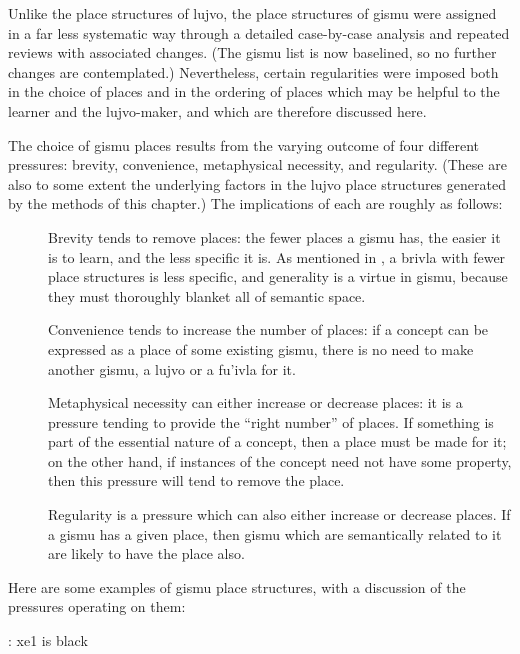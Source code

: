Unlike the place structures of lujvo, the place structures
    of gismu were assigned in a far less systematic way through a
    detailed case-by-case analysis and repeated reviews with
    associated changes. (The gismu list is now baselined, so no
    further changes are contemplated.) Nevertheless, certain
    regularities were imposed both in the choice of places and in
    the ordering of places which may be helpful to the learner and
    the lujvo-maker, and which are therefore discussed here.

The choice of gismu places results from the varying outcome
    of four different pressures: brevity, convenience, metaphysical
    necessity, and regularity. (These are also to some extent the
    underlying factors in the lujvo place structures generated by
    the methods of this chapter.) The implications of each are
    roughly as follows:
\begin{description}
\item[] Brevity tends to remove places: the fewer places a gismu has, the easier it is to learn, and the less specific it is. As mentioned in , a brivla with fewer place structures is less specific, and generality is a virtue in gismu, because they must thoroughly blanket all of semantic space.
\item[] Convenience tends to increase the number of places: if a concept can be expressed as a place of some existing gismu, there is no need to make another gismu, a lujvo or a fu'ivla for it.
\item[] Metaphysical necessity can either increase or decrease places: it is a pressure tending to provide the ``right number'' of places. If something is part of the essential nature of a concept, then a place must be made for it; on the other hand, if instances of the concept need not have some property, then this pressure will tend to remove the place.
\item[] Regularity is a pressure which can also either increase or decrease places. If a gismu has a given place, then gismu which are semantically related to it are likely to have the place also.

\end{description}

Here are some examples of gismu place structures, with a
    discussion of the pressures operating on them:
\begin{example}
:  xe1 is black
\end{example}

